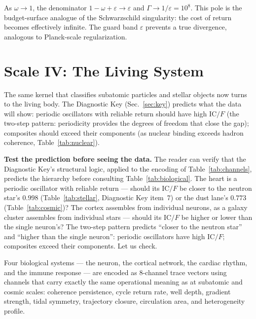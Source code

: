 \documentclass[
  aps,
  prd,
  twocolumn,
  superscriptaddress,
  nofootinbib,
  floatfix
]{revtex4-2}
\newcommand{\Gam}{\Gamma}
\newcommand{\eps}{\varepsilon}
\newcommand{\IC}{\mathrm{IC}}
\begin{document}
As $\omega \to 1$, the denominator $1 - \omega + \eps \to \eps$
and $\Gam \to 1/\eps = 10^8$.  This pole is the budget-surface
analogue of the Schwarzschild singularity: the cost of return
becomes effectively infinite.  The guard band $\eps$ prevents
a true divergence, analogous to Planck-scale regularization.


\section{Scale IV: The Living System}\label{sec:biology}

The same kernel that classifies subatomic particles and
stellar objects now turns to the living body.  The Diagnostic
Key (Sec.~\ref{sec:key}) predicts what the data will show:
periodic oscillators with reliable return should have high
$\IC/F$ (the two-step pattern: periodicity provides the
degrees of freedom that close the gap); composites should
exceed their components (as nuclear binding exceeds hadron
coherence, Table~\ref{tab:nuclear}).

\textbf{Test the prediction before seeing the data.}
The reader can verify that the Diagnostic Key's structural
logic, applied to the encoding of Table~\ref{tab:channels},
predicts the hierarchy before consulting
Table~\ref{tab:biological}.
The heart is a periodic oscillator with
reliable return --- should its $\IC/F$ be closer to the
neutron star's $0.998$ (Table~\ref{tab:stellar},
Diagnostic Key item~7) or the dust lane's $0.773$
(Table~\ref{tab:cosmic})?  The cortex assembles from
individual neurons, as a galaxy cluster assembles from
individual stars --- should its $\IC/F$ be higher or
lower than the single neuron's?  The two-step pattern
predicts ``closer to the neutron star'' and ``higher
than the single neuron'': periodic oscillators have high
$\IC/F$; composites exceed their components.  Let us check.

Four biological systems --- the neuron, the
cortical network, the cardiac rhythm, and the immune response
--- are encoded as 8-channel trace vectors using channels
that carry exactly the same operational meaning as at
subatomic and cosmic scales: coherence persistence, cycle
return rate, well depth, gradient strength, tidal symmetry,
trajectory closure, circulation area, and heterogeneity
profile.
\end{document}
